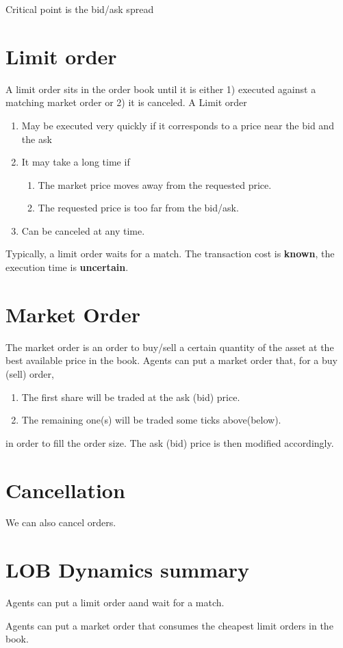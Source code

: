 \documentclass[twocolumn,openany]{book}
\begin{document}
Critical point is the bid/ask spread
\section{Limit order}
A limit order sits in the order book until it is either 
1) executed against a matching market order or 
2) it is canceled.
A Limit order
\begin{enumerate}
	\item May be executed very quickly if it corresponds to a price near the bid and the ask
	\item It may take a long time if
	\begin{enumerate}
		\item The market price moves away from the requested price.
		\item The requested price is too far from the bid/ask.
	\end{enumerate}
	\item Can be canceled at any time.
\end{enumerate}
Typically, a limit order waits for a match. The transaction cost is {\bf known}, the execution time is {\bf uncertain}.

\section{Market Order}
The market order is an order to buy/sell a certain quantity of the asset at the best available price in the book.
Agents can put a market order that, for a buy (sell) order,
\begin{enumerate}
	\item The first share will be traded at the ask (bid) price.
	\item The remaining one(s) will be traded some ticks above(below).
\end{enumerate}
in order to fill the order size. The ask (bid) price is then modified accordingly.

\section{Cancellation}
We can also cancel orders.

\section{LOB Dynamics summary}
Agents can put a limit order aand wait for a match.

Agents can put a market order that consumes the cheapest limit orders in the book.
\end{document}
